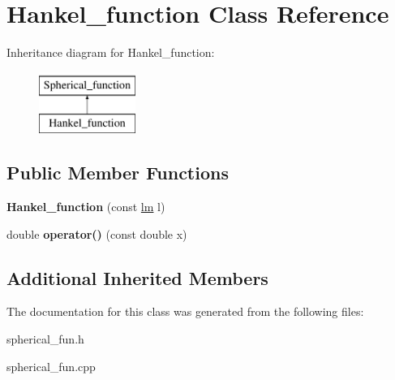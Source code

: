 \hypertarget{classHankel__function}{}\section{Hankel\+\_\+function Class Reference}
\label{classHankel__function}
Inheritance diagram for Hankel\+\_\+function\+:\begin{figure}[H]
\begin{center}
\leavevmode
\includegraphics[height=2.000000cm]{classHankel__function}
\end{center}
\end{figure}
\subsection*{Public Member Functions}
\begin{DoxyCompactItemize}
\item 
\mbox{\label{classHankel__function_aa7438098a69c8b18b79656fc7c7bba06}} 
{\bfseries Hankel\+\_\+function} (const \hyperlink{structlm}{lm} l)
\item 
\mbox{\label{classHankel__function_a6a21fbc7f8252f6a293d0a05b4990024}} 
double {\bfseries operator()} (const double x)
\end{DoxyCompactItemize}
\subsection*{Additional Inherited Members}


The documentation for this class was generated from the following files\+:\begin{DoxyCompactItemize}
\item 
spherical\+\_\+fun.\+h\item 
spherical\+\_\+fun.\+cpp\end{DoxyCompactItemize}
